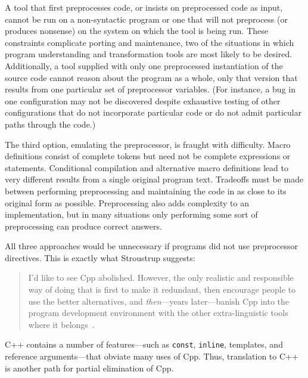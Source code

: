 A tool that first preprocesses code, or insists on preprocessed code as
input, cannot be run on a non-syntactic program or one that will not
preprocess (or produces nonsense) on the system on which the tool is being
run.  These constraints complicate porting and maintenance, two of the
situations in which program understanding and transformation tools are most
likely to be desired.  Additionally, a tool supplied with only one preprocessed
instantiation of the source code cannot reason about the program as a
whole, only that version that results from one particular set of
preprocessor variables.  (For instance, a bug in one configuration may not
be discovered despite exhaustive testing of other configurations that do
not incorporate particular code or do not admit particular paths through
the code.)

The third option, emulating the preprocessor, is fraught with difficulty.
Macro definitions consist of complete tokens but need not be complete
expressions or statements.  Conditional compilation and alternative macro
definitions lead to very different results from a single original program
text.  Tradeoffs must be made between performing preprocessing and
maintaining the code in as close to its original form as possible.
Preprocessing also adds complexity to an implementation, but in many
situations only performing some sort of preprocessing can produce correct
answers.

All three approaches would be unnecessary if programs did not use
preprocessor directives.  This is exactly what Stroustrup suggests:
\begin{quote}
  I'd like to see Cpp abolished.  However, the only realistic and
  responsible way of doing that is first to make it redundant, then
  encourage people to use the better alternatives, and {\em then\/}---years
  later---banish Cpp into the program development environment with the
  other extra-linguistic tools where it
  belongs~\cite[p.~426]{Stroustrup-DesignEvolution}.
\end{quote}
C++ contains a number of features---such as \verb|const|, \verb|inline|,
templates, and reference arguments---that obviate many uses of Cpp.  Thus,
translation to C++
is another path for partial elimination of Cpp.  


